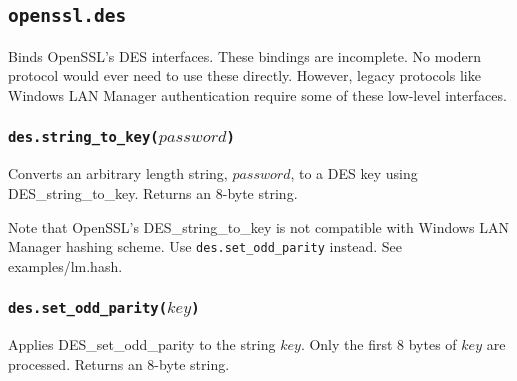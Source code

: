 \documentclass[11pt, oneside]{memoir}
\newcommand*{\fn}[1]{\texttt{#1}\xspace}
\newcounter{toccols}
\newenvironment{Module}[1]{
	\subsection{\texttt{#1}}
	\addtocontents{toc}{
		\protect\begin{multicols}{\value{toccols}}
	}
}{
	\addtocontents{toc}{\protect\end{multicols}}
}
\begin{document}
\begin{Module}{openssl.des}

Binds OpenSSL's DES interfaces. These bindings are incomplete. No modern protocol would ever need to use these directly. However, legacy protocols like Windows LAN Manager authentication require some of these low-level interfaces.

\subsubsection[\fn{des.string\_to\_key}]{\fn{des.string\_to\_key($password$)}}

Converts an arbitrary length string, $password$, to a DES key using DES\_string\_to\_key. Returns an 8-byte string.

Note that OpenSSL's DES\_string\_to\_key is not compatible with Windows LAN Manager hashing scheme. Use \fn{des.set\_odd\_parity} instead. See examples/lm.hash.

\subsubsection[\fn{des.set\_odd\_parity}]{\fn{des.set\_odd\_parity($key$)}}

Applies DES\_set\_odd\_parity to the string $key$. Only the first 8 bytes of $key$ are processed. Returns an 8-byte string.

\end{Module}
\end{document}
